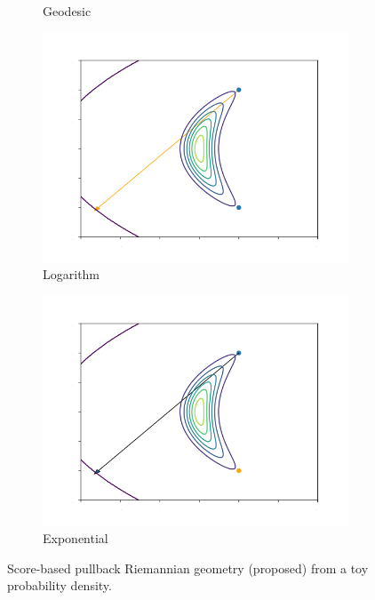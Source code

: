 \begin{figure}[h!]
\begin{subfigure}{0.24\linewidth}
        \caption{{Geodesic}}
        \label{fig:toy-example-geodesic}
    \end{subfigure}
    \begin{subfigure}{0.24\linewidth}
        \includegraphics[width=\linewidth]{Chapter5/results/banana-distribution/logarithmic.png}
        \caption{{Logarithm}}
        \label{fig:toy-example-log}
    \end{subfigure}
    \begin{subfigure}{0.24\linewidth}
        \includegraphics[width=\linewidth]{Chapter5/results/banana-distribution/exponential.png}
        \caption{{Exponential}}
        \label{fig:toy-example-exp}
    \end{subfigure}
    \caption{Score-based pullback Riemannian geometry (proposed) from a toy probability density.}
    \label{fig:toy-example}
\end{figure}

